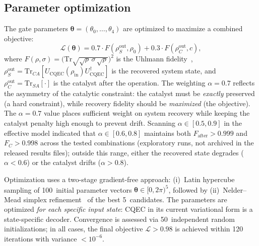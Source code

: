 \documentclass[a4paper,twocolumn]{quantumarticle}
\begin{document}
\subsection{Parameter optimization}
\label{sec:optimization}

The gate parameters $\boldsymbol{\theta} = (\theta_0, \ldots, \theta_4)$ are optimized to maximize a combined objective:
\begin{equation}
\mathcal{L}(\boldsymbol{\theta}) = 0.7 \cdot F(\rho_S^\mathrm{out}, \rho_0) + 0.3 \cdot F(\rho_C^\mathrm{out}, c),
\label{eq:objective}
\end{equation}
where $F(\rho, \sigma) = \bigl(\mathrm{Tr}\sqrt{\sqrt{\rho}\,\sigma\,\sqrt{\rho}}\bigr)^2$ is the Uhlmann fidelity~\cite{Jozsa1994}, $\rho_S^\mathrm{out} = \mathrm{Tr}_{CA}[U_\mathrm{CQEC}(\rho_\mathrm{in})U_\mathrm{CQEC}^\dagger]$ is the recovered system state, and $\rho_C^\mathrm{out} = \mathrm{Tr}_{SA}[\cdot]$ is the catalyst after the operation.
The weighting $\alpha = 0.7$ reflects the asymmetry of the catalytic constraint: the catalyst must be \emph{exactly} preserved (a hard constraint), while recovery fidelity should be \emph{maximized} (the objective).
The $\alpha = 0.7$ value places sufficient weight on system recovery while keeping the catalyst penalty high enough to prevent drift.
Scanning $\alpha \in [0.5, 0.9]$ in the effective model indicated that $\alpha \in [0.6, 0.8]$ maintains both $F_\mathrm{after} > 0.999$ and $F_C > 0.998$ across the tested combinations (exploratory runs, not archived in the released results files); outside this range, either the recovered state degrades ($\alpha < 0.6$) or the catalyst drifts ($\alpha > 0.8$).

Optimization uses a two-stage gradient-free approach: (i)~Latin hypercube sampling of 100~initial parameter vectors $\boldsymbol{\theta} \in [0, 2\pi)^5$, followed by (ii)~Nelder--Mead simplex refinement~\cite{NelderMead1965} of the best 5~candidates.
The parameters are optimized \emph{for each specific input state}: CQEC in its current variational form is a state-specific decoder.
Convergence is assessed via 50~independent random initializations; in all cases, the final objective $\mathcal{L} > 0.98$ is achieved within 120 iterations with variance $< 10^{-6}$.
\end{document}
